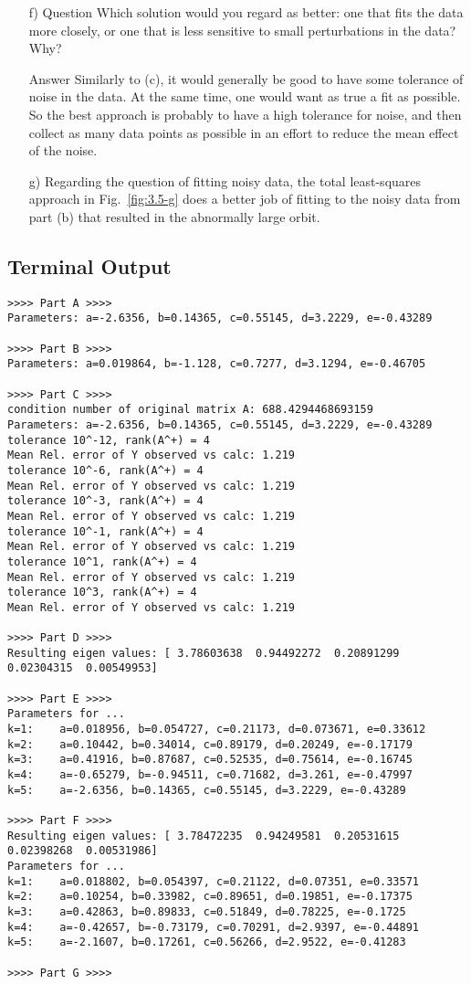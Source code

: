 \documentclass[paper=a4, fontsize=11pt]{scrartcl}
\numberwithin{equation}{section}		%
\numberwithin{figure}{section}			%
\numberwithin{table}{section}				%
\begin{document}
\begin{enumerate}[(a)]
	\item[f) Question] Which solution would you regard as better: one that fits the data more closely, or one that is less sensitive to small perturbations in the data? Why? \vspace{-2mm}
		\item[Answer] Similarly to (c), it would generally be good to have some tolerance of noise in the data. At the same time, one would want as true a fit as possible. So the best approach is probably to have a high tolerance for noise, and then collect as many data points as possible in an effort to reduce the mean effect of the noise.
	\item[g)] Regarding the question of fitting noisy data, the total least-squares approach in Fig.~\ref{fig:3.5-g} does a better job of fitting to the noisy data from part (b) that resulted in the abnormally large orbit.
\end{enumerate}

\vspace{4mm}
\subsection{Terminal Output}
\begin{verbatim}
>>>> Part A >>>>
Parameters: a=-2.6356, b=0.14365, c=0.55145, d=3.2229, e=-0.43289

>>>> Part B >>>>
Parameters: a=0.019864, b=-1.128, c=0.7277, d=3.1294, e=-0.46705

>>>> Part C >>>>
condition number of original matrix A: 688.4294468693159
Parameters: a=-2.6356, b=0.14365, c=0.55145, d=3.2229, e=-0.43289
tolerance 10^-12, rank(A^+) = 4
Mean Rel. error of Y observed vs calc: 1.219
tolerance 10^-6, rank(A^+) = 4
Mean Rel. error of Y observed vs calc: 1.219
tolerance 10^-3, rank(A^+) = 4
Mean Rel. error of Y observed vs calc: 1.219
tolerance 10^-1, rank(A^+) = 4
Mean Rel. error of Y observed vs calc: 1.219
tolerance 10^1, rank(A^+) = 4
Mean Rel. error of Y observed vs calc: 1.219
tolerance 10^3, rank(A^+) = 4
Mean Rel. error of Y observed vs calc: 1.219

>>>> Part D >>>>
Resulting eigen values: [ 3.78603638  0.94492272  0.20891299  0.02304315  0.00549953]

>>>> Part E >>>>
Parameters for ...
k=1:    a=0.018956, b=0.054727, c=0.21173, d=0.073671, e=0.33612
k=2:    a=0.10442, b=0.34014, c=0.89179, d=0.20249, e=-0.17179
k=3:    a=0.41916, b=0.87687, c=0.52535, d=0.75614, e=-0.16745
k=4:    a=-0.65279, b=-0.94511, c=0.71682, d=3.261, e=-0.47997
k=5:    a=-2.6356, b=0.14365, c=0.55145, d=3.2229, e=-0.43289

>>>> Part F >>>>
Resulting eigen values: [ 3.78472235  0.94249581  0.20531615  0.02398268  0.00531986]
Parameters for ...
k=1:    a=0.018802, b=0.054397, c=0.21122, d=0.07351, e=0.33571
k=2:    a=0.10254, b=0.33982, c=0.89651, d=0.19851, e=-0.17375
k=3:    a=0.42863, b=0.89833, c=0.51849, d=0.78225, e=-0.1725
k=4:    a=-0.42657, b=-0.73179, c=0.70291, d=2.9397, e=-0.44891
k=5:    a=-2.1607, b=0.17261, c=0.56266, d=2.9522, e=-0.41283

>>>> Part G >>>>

\end{verbatim}
\end{document}
